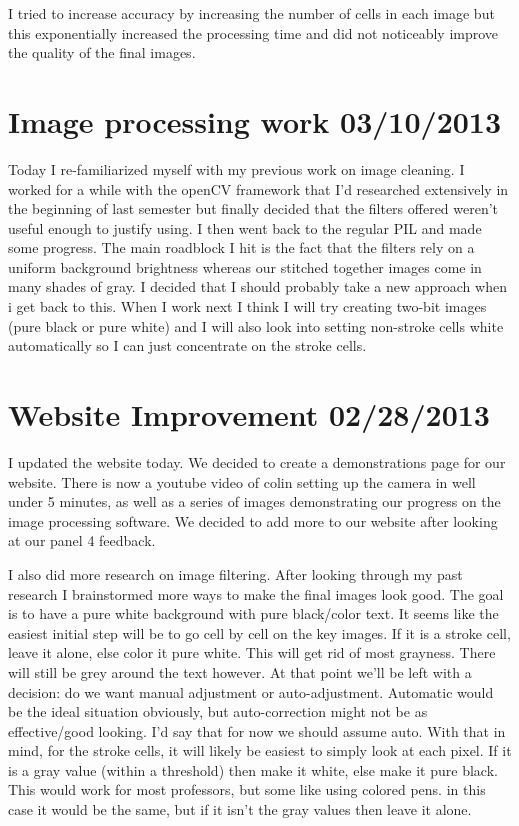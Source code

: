 \documentclass[]{article}
\begin{document}
	I tried to increase accuracy by increasing the number of cells in each image but this exponentially increased the processing time and did not noticeably improve the quality of the final images.
	
	\section{Image processing work 03/10/2013}
	
	Today I re-familiarized myself with my previous work on image cleaning. I worked for a while with the openCV framework that I'd researched extensively in the beginning of last semester but finally decided that the filters offered weren't useful enough to justify using. I then went back to the regular PIL and made some progress. The main roadblock I hit is the fact that the filters rely on a uniform background brightness whereas our stitched together images come in many shades of gray. I decided that I should probably take a new approach when i get back to this. When I work next I think I will try creating two-bit images (pure black or pure white) and I will also look into setting non-stroke cells white automatically so I can just concentrate on the stroke cells.
	
	
	\section{Website Improvement 02/28/2013}
	
	I updated the website today. We decided to create a demonstrations page for our website.
	There is now a youtube video of colin setting up the camera in well under 5 minutes, as well as a series of images demonstrating our progress on the image processing software. We decided to add more to our website after looking at our panel 4 feedback. 
	
	I also did more research on image filtering. After looking through my past research I brainstormed more ways to make the final images look good. The goal is to have a pure white background with pure black/color text. It seems like the easiest initial step will be to go cell by cell on the key images. If it is a stroke cell, leave it alone, else color it pure white. This will get rid of most grayness. There will still be grey around the text however. 
	At that point we'll be left with a decision: do we want manual adjustment or auto-adjustment. Automatic would be the ideal situation obviously, but auto-correction might not be as effective/good looking.
	I'd say that for now we should assume auto. With that in mind, for the stroke cells, it will likely be easiest to simply look at each pixel. If it is a gray value (within a threshold) then make it white, else make it pure black. This would work for most professors, but some like using colored pens. in this case it would be the same, but if it isn't the gray values then leave it alone.
	
\end{document}
